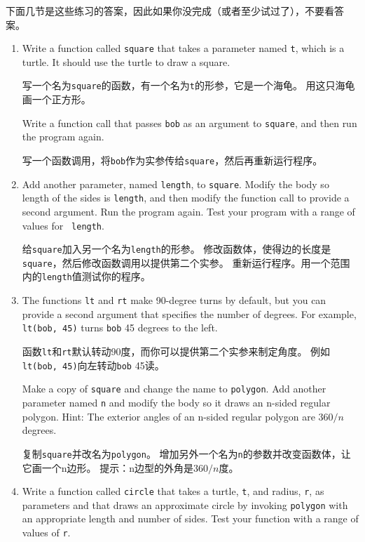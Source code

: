 \documentclass[10pt]{book}
\begin{document}
\begin{CJK}{UTF8}{gbsn}
下面几节是这些练习的答案，因此如果你没完成（或者至少试过了），不要看答案。

\begin{enumerate}

\item Write a function called {\tt square} that takes a parameter
named {\tt t}, which is a turtle.  It should use the turtle to draw
a square.

写一个名为{\tt square}的函数，有一个名为{\tt t}的形参，它是一个海龟。
用这只海龟画一个正方形。

Write a function call that passes {\tt bob} as an argument to
{\tt square}, and then run the program again.

写一个函数调用，将{\tt bob}作为实参传给{\tt square}，然后再重新运行程序。

\item Add another parameter, named {\tt length}, to {\tt square}.
Modify the body so length of the sides is {\tt length}, and then
modify the function call to provide a second argument.  Run the
program again.  Test your program with a range of values for {\tt
length}.

给{\tt square}加入另一个名为{\tt length}的形参。
修改函数体，使得边的长度是{\tt square}，然后修改函数调用以提供第二个实参。
重新运行程序。用一个范围内的{\tt length}值测试你的程序。

\item The functions {\tt lt} and {\tt rt} make 90-degree turns by
default, but you can provide a second argument that specifies the
number of degrees.  For example, {\tt lt(bob, 45)} turns {\tt bob} 45
degrees to the left.

函数{\tt lt}和{\tt rt}默认转动90度，而你可以提供第二个实参来制定角度。
例如{\tt lt(bob, 45)}向左转动{\tt bob} 45读。

Make a copy of {\tt square} and change the name to {\tt polygon}.  Add
another parameter named {\tt n} and modify the body so it draws an
n-sided regular polygon.  Hint: The exterior angles of an n-sided regular
polygon are $360/n$ degrees.

复制{\tt square}并改名为{\tt polygon}。
增加另外一个名为{\tt n}的参数并改变函数体，让它画一个n边形。
提示：n边型的外角是$360/n$度。

\item Write a function called {\tt circle} that takes a turtle, {\tt t},
and radius, {\tt r}, as parameters and that draws an approximate circle
by invoking {\tt polygon} with an appropriate length and number of
sides.  Test your function with a range of values of {\tt r}.


\end{enumerate}
\end{CJK}
\end{document}
